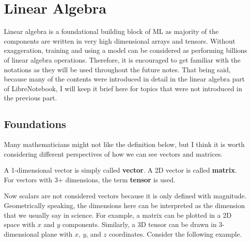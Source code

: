 \documentclass[../../main.tex]{subfiles}
\begin{document}
\section{Linear Algebra}

Linear algebra is a foundational building block of ML as majority
of the components are written in very high dimensional arrays
and tensors. Without exaggeration, training and using a model
can be considered as performing billions of linear algebra
operations. Therefore, it is encouraged to get familiar with
the notations as they will be used throughout the future notes.
That being said, because many of the contents were introduced
in detail in the linear algebra part of LibreNotebook, I will
keep it brief here for topics that were not introduced in the
previous part.

\subsection{Foundations}

Many mathematicians might not like the definition below, but I think
it is worth considering different perspectives of how we can see
vectors and matrices.

\begin{definition}{}{}
A 1-dimensional vector is simply called \textbf{vector}. A 2D vector
is called \textbf{matrix}. For vectors with 3+ dimensions, the term
\textbf{tensor} is used.
\end{definition}

Now scalars are not considered vectors because it is only defined
with magnitude. Geometrically speaking, the dimensions here can be
interpreted as the dimension that we usually say in science.
For example, a matrix can be plotted in a 2D space with $x$ and $y$
components. Similarly, a 3D tensor can be drawn in 3-dimensional
plane with $x$, $y$, and $z$ coordinates. Consider the following
example.
\end{document}
